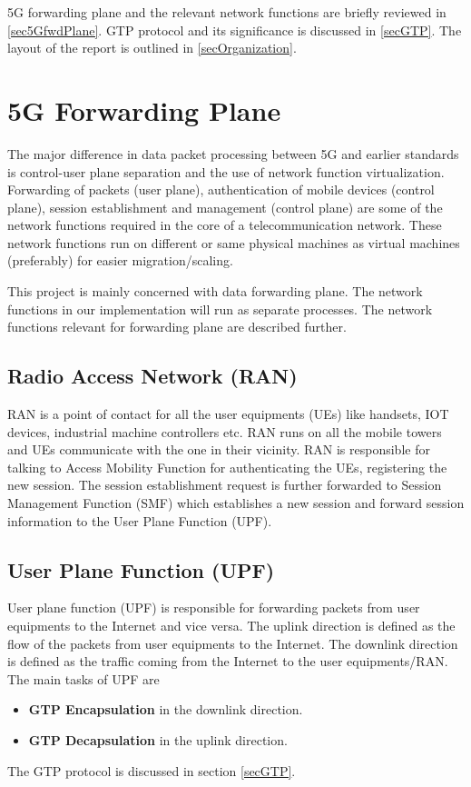 5G forwarding plane and the relevant network functions are 
briefly reviewed in \ref{sec5GfwdPlane}. GTP protocol and its 
significance is discussed in \ref{secGTP}. 
The layout of the report is outlined in \ref{secOrganization}. 

\section {5G Forwarding Plane \label{sec5GfwdPlane}}
The major difference in  data packet processing between 5G and earlier standards is control-user plane 
separation and the use of network function virtualization. Forwarding of packets (user plane), 
authentication of mobile devices (control plane), session establishment and management (control plane) are some of the network 
functions required in the core of a telecommunication network. These network functions run on different or same physical machines as 
virtual machines (preferably) for easier migration/scaling.

This project is mainly concerned with data forwarding plane. The network functions in our implementation will 
run as separate processes. The network functions relevant for forwarding plane are described further.
\subsection{Radio Access Network (RAN) \label{secchap1RAN}} 
RAN is a point of contact for all the user equipments (UEs) like handsets, IOT devices, industrial machine controllers etc. 
RAN runs on all the mobile towers and UEs communicate with the one in their vicinity. RAN is
 responsible for talking to Access Mobility Function for authenticating the UEs, registering the  new
  session. The session establishment request is further forwarded to Session Management Function
  (SMF) which establishes a new session and forward session information to the User Plane Function (UPF). 
  \subsection{User Plane Function (UPF) \label{sechap1UPF}}
  User plane function (UPF) is responsible for forwarding packets from user equipments to the
   Internet and vice versa. The uplink direction is defined as the flow of the packets from user
    equipments to the Internet. The downlink direction is defined as the traffic coming from the Internet  to the user equipments/RAN. 
  The main tasks of UPF are 
  \begin{itemize}
    \item \textbf{GTP Encapsulation} in the downlink direction.
    \item \textbf{GTP Decapsulation} in the uplink direction.
  \end{itemize}
  The GTP protocol is discussed in section \ref{secGTP}.

